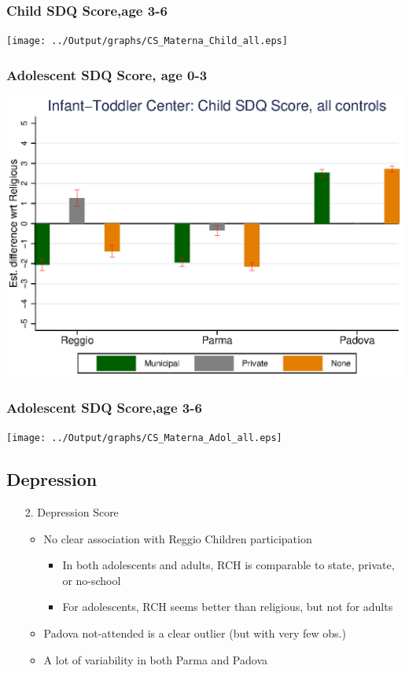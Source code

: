 \documentclass{beamer}
\begin{document}
\begin{frame}\frametitle{Child SDQ Score,age 3-6}
\center
\texttt{[image: ../Output/graphs/CS\_Materna\_Child\_all.eps]}
\end{frame}

\begin{frame}\frametitle{Adolescent SDQ Score, age 0-3}
\center
\includegraphics[scale=0.7]{../Output/graphs/CS_Asilo_Adol_all.eps}
\end{frame}

\begin{frame}\frametitle{Adolescent SDQ Score,age 3-6}
\center
\texttt{[image: ../Output/graphs/CS\_Materna\_Adol\_all.eps]}
\end{frame}


\subsection{Depression}
\begin{frame}
\begin{itemize}
	\centering
	\item[2.] Depression Score
	\vspace{3ex}
	\begin{itemize}
		\item No clear association with Reggio Children participation
		\begin{itemize}
			\item In both adolescents and adults, RCH is comparable to state, private, or no-school
			\item For adolescents, RCH seems better than religious, but not for adults
		\end{itemize}
		\vspace{2ex}
		\item Padova not-attended is a clear outlier (but with very few obs.)
		\item A lot of variability in both Parma and Padova
	\end{itemize}
\end{itemize}
\end{frame}
\end{document}
